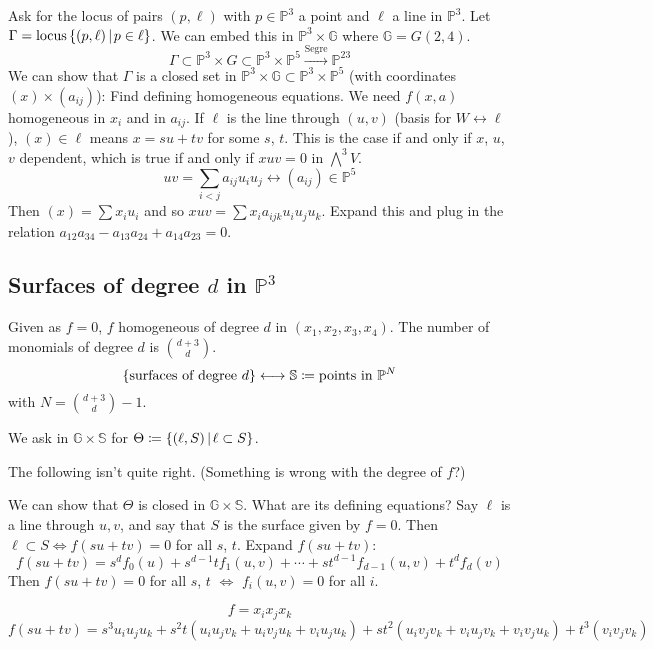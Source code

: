 \documentclass [letterpaper,11pt,twoside]{article}
\begin{document}
  Ask for the locus of pairs $(p, \ell)$ with $p \in \mathbb P^3$ a point and $\ell$ a line in $\mathbb P^3$.  Let $\Gamma = \text{locus}\mathset[(p, \ell)]{p\in \ell}$.  We can embed this in $\mathbb P^3 \times \mathbb G$ where $\mathbb G = G(2, 4)$.
  $$\Gamma \subset \mathbb P^3 \times G \subset \mathbb P^3 \times \mathbb P^5 \stackrel{\text{Segre}}{\to} \mathbb P^{23}$$
  We can show that $\Gamma$ is a closed set in $\mathbb P^3 \times \mathbb G \subset \mathbb P^3 \times \mathbb P^5$ (with coordinates $(x)\times (a_{ij})$): Find defining homogeneous equations.
  We need $f(x, a)$ homogeneous in $x_i$ and in $a_{ij}$.  If $\ell$ is the line through $(u, v)$ (basis for $W\longleftrightarrow \ell$), $(x)\in \ell$ means $x = su + tv$ for some $s$, $t$.  This is the case if and only if $x$, $u$, $v$ dependent, which is true if and only if $xuv = 0$ in $\bigwedge^3 V$.
  $$uv = \sum\limits_{i<j} a_{ij} u_i u_j \longleftrightarrow (a_{ij}) \in \mathbb P^5$$
  Then $(x) = \sum x_i u_i$ and so $xuv = \sum x_i a_{ijk} u_i u_j u_k$.  Expand this and plug in the relation $a_{12}a_{34} - a_{13}a_{24} + a_{14}a_{23} = 0$.

  \subsection*{Surfaces of degree \texorpdfstring{$d$}{d} in \texorpdfstring{$\mathbb P^3$}{ℙ³}}
    Given as $f = 0$, $f$ homogeneous of degree $d$ in $(x_1, x_2, x_3, x_4)$.  The number of monomials of degree $d$ is $\binom{d+3}{d}$.
    $$\left\{\text{surfaces of degree }d\right\} \longleftrightarrow \mathbb S \coloneqq \text{points in }\mathbb P^N$$
    with $N = \binom{d + 3}{d} - 1$.

    We ask in $\mathbb G \times \mathbb S$ for $\Theta \defeq \mathset[(\ell, S)]{\ell \subset S}$.

    The following isn't quite right.  (Something is wrong with the degree of $f$?)

    We can show that $\Theta$ is closed in $\mathbb G \times \mathbb S$.  What are its defining equations?  Say $\ell$ is a line through $u, v$, and say that $S$ is the surface given by $f = 0$.  Then $\ell \subset S \iff f(su + tv) = 0$ for all $s$, $t$.  Expand $f(su+tv)$:
    $$f(su + tv) = s^d f_0(u) + s^{d-1} t f_1(u, v) + \cdots + s t^{d-1} f_{d-1}(u, v) + t^d f_d(v)$$
    Then $f(su+tv) = 0$ for all $s$, $t$ $\iff$ $f_i(u, v) = 0$ for all $i$.

    \begin{digression}
      \begin{example*}
        $$f = x_i x_j x_k$$
        $f(su + tv) = s^3 u_i u_j u_k + s^2 t(u_i u_j v_k + u_i v_j u_k + v_i u_j u_k) + st^2(u_i v_j v_k + v_i u_j v_k + v_i v_j u_k) + t^3 (v_i v_j v_k)$
      \end{example*}
    \end{digression}
\end{document}
